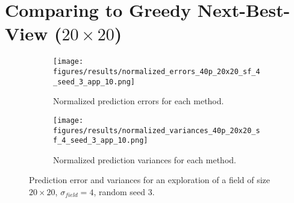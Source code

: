 \section{Comparing to Greedy Next-Best-View ($20 \times 20$)} \label{sec:s3_nbvcomp}

\begin{figure}[htb!]
    \centering
    \begin{subfigure}[t]{0.5\textwidth}
        \centering
        \texttt{[image: figures/results/normalized\_errors\_40p\_20x20\_sf\_4\_seed\_3\_app\_10.png]}
        \ssp
        \captionsetup{skip=0.20\baselineskip,size=footnotesize}
        \caption{Normalized prediction errors for each method.}
    \end{subfigure}%
    \begin{subfigure}[t]{0.5\textwidth}
        \centering
        \texttt{[image: figures/results/normalized\_variances\_40p\_20x20\_sf\_4\_seed\_3\_app\_10.png]}
        \ssp
        \captionsetup{skip=0.20\baselineskip,size=footnotesize}
        \caption{Normalized prediction variances for each method.}
    \end{subfigure}%
    \ssp
    \captionsetup{skip=0.20\baselineskip}
    \caption{Prediction error and variances for an exploration of a field of size $20 \times 20$, $\sigma_{field} = 4$, random seed 3.}
    \label{fig:s3_nbvcomp}
\end{figure}

